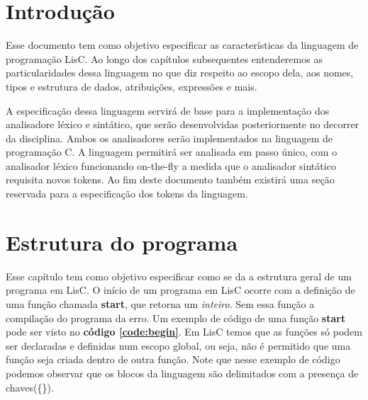 \documentclass[
  12pt,				%
  oneside,			%
  a4paper,			%
  english,			%
  french,				%
  spanish,			%
  brazil,				%
]{abntex2}
\begin{document}
\frenchspacing 



\imprimirfolhaderosto*


\tableofcontents*

\textual
\chapter{Introdução}
\label{cha:intro}
Esse documento tem como objetivo especificar as características da
linguagem de programação LisC. Ao longo dos capítulos subsequentes
entenderemos as particularidades dessa linguagem no que diz respeito
ao escopo dela, aos nomes, tipos e estrutura de dados, atribuições,
expressões e mais.

A especificação dessa linguagem servirá de base para a implementação
dos analisadore léxico e sintático, que serão desenvolvidas
posteriormente no decorrer da disciplina. Ambos os analisadores serão
implementados na linguagem de programação C. A linguagem permitirá ser
analisada em passo único, com o analisador léxico funcionando
on-the-fly a medida que o analisador sintático requisita novos
tokens. Ao fim deste documento também existirá uma seção reservada
para a especificação dos tokens da linguagem.




\chapter{Estrutura do programa}
\label{cha:estrutura-do-programa}
Esse capítulo tem como objetivo especificar como se da a estrutura
geral de um programa em LisC. O início de um programa em LisC ocorre
com a definição de uma função chamada \textbf{start}, que retorna um
\emph{inteiro}. Sem essa função a compilação do programa da erro. Um
exemplo de código de uma função \textbf{start} pode ser visto no
\textbf{código \ref{code:begin}}.
Em LisC temos que as funções só podem ser declaradas e definidas num
escopo global, ou seja, não é permitido que uma função seja criada
dentro de outra função. Note que nesse exemplo de código podemos
observar que os blocos da linguagem são delimitados com a presença
de chaves(\{\}).
\end{document}
